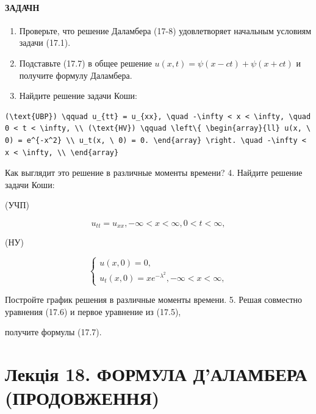 \documentclass[
  ukrainian,
]{article}
\begin{document}
\paragraph{ЗАДАЧН}\label{ux437ux430ux434ux430ux447ux43d}

\begin{enumerate}
\def\labelenumi{\arabic{enumi}.}
\item
  Проверьте, что решение Даламбера (17-8) удовлетворяет начальным
  условиям задачи (17.1).
\item
  Подставьте (17.7) в общее решение
  \(u(x, t) = \psi(x - ct) + \psi(x + ct)\) и получите формулу
  Даламбера.
\item
  Найдите решение задачи Коши:
\end{enumerate}

\begin{verbatim}
(\text{UBP}) \qquad u_{tt} = u_{xx}, \quad -\infty < x < \infty, \quad 0 < t < \infty, \\ (\text{HV}) \qquad \left\{ \begin{array}{ll} u(x, \ 0) = e^{-x^2} \\ u_t(x, \ 0) = 0. \end{array} \right. \quad -\infty < x < \infty, \\ \end{array}
\end{verbatim}

Как выглядит это решение в различные моменты времени? 4. Найдите решение
задачи Коши:

(УЧП)

\[
u_{tt} = u_{xx}, -\infty < x < \infty, 0 < t < \infty,
\]

(НУ)

\[
\begin{cases} u(x, 0) = 0, \\ u_t(x, 0) = xe^{-\lambda^2}, -\infty < x < \infty, \end{cases}
\]

Постройте график решения в различные моменты времени. 5. Решая совместно
уравнения (17.6) и первое уравнение из (17.5),

получите формулы (17.7).

\section{Лекція 18. ФОРМУЛА Д'АЛАМБЕРА
(ПРОДОВЖЕННЯ)}\label{ux43bux435ux43aux446ux456ux44f-18.-ux444ux43eux440ux43cux443ux43bux430-ux434ux430ux43bux430ux43cux431ux435ux440ux430-ux43fux440ux43eux434ux43eux432ux436ux435ux43dux43dux44f}
\end{document}
